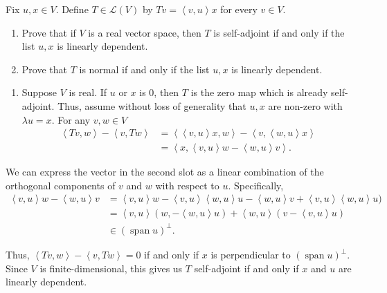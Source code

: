\documentclass[12 pt, letterpaper]{hmcpset}
\begin{document}
\pagebreak

\begin{problem}[26]
	Fix $u, x \in V$. Define $T \in \mathcal{L}(V)$ by $Tv = \left < v, u \right > x$ for every $v \in V$.
	\begin{enumerate}
		\item Prove that if $V$ is a real vector space, then $T$ is self-adjoint if and only if the list  $u, x$ is linearly dependent.
		\item Prove that $T$ is normal if and only if the list $u, x$ is linearly dependent.
	\end{enumerate}
\end{problem}

\begin{solution}
	\begin{enumerate}
		\item Suppose $V$ is real. If $u$ or $x$ is $0$, then $T$ is the zero map which is already self-adjoint. Thus, assume without loss of generality that $u, x$ are non-zero with $\lambda u = x$. For any $v, w \in V$
			\begin{align*}
				\left < Tv, w \right > - \left < v, T w \right > & = \left < \left < v, u \right > x, w \right > - \left < v, \left < w, u \right > x \right > \\
										 & = \left < x, \left < v, u \right > w - \left < w, u \right > v \right >.
			\end{align*}
	\end{enumerate}

	We can express the vector in the second slot as a linear combination of the orthogonal components of $v$ and $w$ with respect to $u$. Specifically,
	\begin{align*}
		\left < v, u \right > w - \left < w, u \right > v & = \left < v, u \right > w - \left < v, u \right > \left < w, u \right > u - \left < w, u \right > v + \left < v, u \right > \left < w, u \right > u) \\
								  & = \left < v, u \right > (w, - \left < w, u \right > u) + \left < w, u \right > (v - \left < v, u \right > u) \\
								  & \in (\operatorname{span} u)^{\perp}.
	\end{align*}

	Thus, $\left < Tv, w \right > - \left < v, Tw \right > = 0$ if and only if $x$ is perpendicular to $(\operatorname{span} u)^{\perp}$. Since $V$ is finite-dimensional, this gives us $T$ self-adjoint if and only if $x$ and $u$ are linearly dependent. 
\end{solution}
\end{document}
